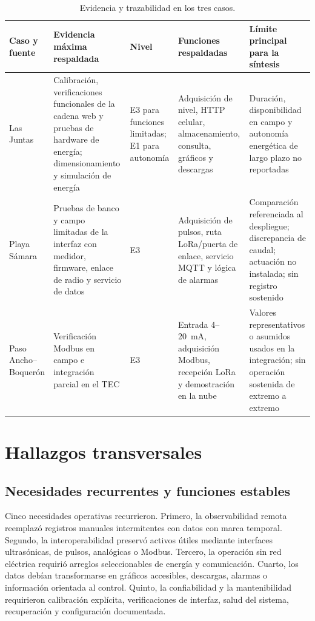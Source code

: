 \documentclass[conference]{IEEEtran}
\begin{document}
\begin{table}[t]
\caption{Evidencia y trazabilidad en los tres casos.}
\label{tab:evidence}
\centering
\scriptsize
\renewcommand{\arraystretch}{1.12}
\begin{tabularx}{\textwidth}{@{}>{\raggedright\arraybackslash}p{}>{\raggedright\arraybackslash}X>{\raggedright\arraybackslash}p{}>{\raggedright\arraybackslash}X>{\raggedright\arraybackslash}X@{}}
\toprule
\textbf{Caso y fuente} & \textbf{Evidencia máxima respaldada} & \textbf{Nivel} & \textbf{Funciones respaldadas} & \textbf{Límite principal para la síntesis} \\
\midrule
Las Juntas \cite{chavarria2021implementacion} & Calibración, verificaciones funcionales de la cadena web y pruebas de hardware de energía; dimensionamiento y simulación de energía & E3 para funciones limitadas; E1 para autonomía & Adquisición de nivel, HTTP celular, almacenamiento, consulta, gráficos y descargas & Duración, disponibilidad en campo y autonomía energética de largo plazo no reportadas \\
Playa Sámara \cite{solorzano2021sistema} & Pruebas de banco y campo limitadas de la interfaz con medidor, firmware, enlace de radio y servicio de datos & E3 & Adquisición de pulsos, ruta LoRa/puerta de enlace, servicio MQTT y lógica de alarmas & Comparación referenciada al despliegue; discrepancia de caudal; actuación no instalada; sin registro sostenido \\
Paso Ancho--Boquerón \cite{oviedo2024desarrollo} & Verificación Modbus en campo e integración parcial en el TEC & E3 & Entrada 4--20~mA, adquisición Modbus, recepción LoRa y demostración en la nube & Valores representativos o asumidos usados en la integración; sin operación sostenida de extremo a extremo \\
\bottomrule
\end{tabularx}
\end{table}

\section{Hallazgos transversales}

\subsection{Necesidades recurrentes y funciones estables}

Cinco necesidades operativas recurrieron. Primero, la observabilidad remota reemplazó registros manuales intermitentes con datos con marca temporal. Segundo, la interoperabilidad preservó activos útiles mediante interfaces ultrasónicas, de pulsos, analógicas o Modbus. Tercero, la operación sin red eléctrica requirió arreglos seleccionables de energía y comunicación. Cuarto, los datos debían transformarse en gráficos accesibles, descargas, alarmas o información orientada al control. Quinto, la confiabilidad y la mantenibilidad requirieron calibración explícita, verificaciones de interfaz, salud del sistema, recuperación y configuración documentada.
\end{document}
